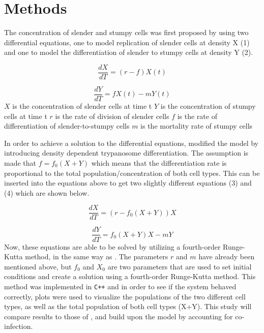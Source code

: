 \documentclass[11pt]{article}
\begin{document}
	
	\section{Methods}
	
	The concentration of slender and stumpy cells was first proposed by \citep{turner1995replication} using two differential equations, one to model replication of slender cells at density X (1) and one to model the differentiation of slender to stumpy cells at density Y (2).
	
	\begin{equation}
		\frac{dX}{dT} = (r-f)X(t)
	\end{equation}
	
	\begin{equation}
		\frac{dY}{dT} = fX(t)-mY(t)
	\end{equation}\newline
	$X$ is the concentration of slender cells at time t \newline
	$Y$ is the concentration of stumpy cells at time t \newline
	$r$ is the rate of division of slender cells \newline
	$f$ is the rate of differentiation of slender-to-stumpy cells \newline
	$m$ is the mortality rate of stumpy cells \newline
	
	In order to achieve a solution to the differential equations, \citep{tyler2001limitation} modified the model by introducing density dependent trypanosome differentiation. The assumption is made that $f = f_0(X+Y)$ which means that the differentiation rate is proportional to the total population/concentration of both cell types. This can be inserted into the equations above to get two slightly different equations (3) and (4) which are shown below.
	
	\begin{equation}
		\frac{dX}{dT} = (r-f_0(X+Y))X
	\end{equation}
	
	\begin{equation}
		\frac{dY}{dT} = f_0(X+Y)X-mY
	\end{equation}
	Now, these equations are able to be solved by utilizing a fourth-order Runge-Kutta method, in the same way as \citep{tyler2001limitation}. The parameters $r$ and $m$ have already been mentioned above, but $f_0$ and $X_0$ are two parameters that are used to set initial conditions and create a solution using a fourth-order Runge-Kutta method. This method was implemented in \texttt{C++} and in order to see if the system behaved correctly, plots were used to visualize the populations of the two different cell types, as well as the total population of both cell types (X+Y). This study will compare results to those of \citep{tyler2001limitation}, and build upon the model by accounting for co-infection.
	
\end{document}
